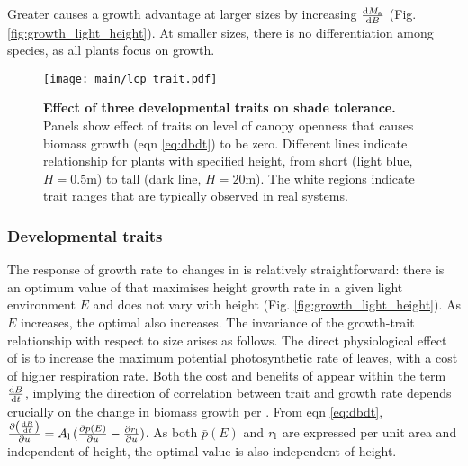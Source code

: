 \documentclass[9pt,twocolumn,twoside,lineno]{pnas-new}
\begin{document}
Greater {\hmat} causes a growth advantage at larger sizes by increasing $\frac{{\rm d}M_{\rm a}}{{\rm d}B}$ (Fig. \ref{fig:growth_light_height}). At smaller sizes, there is no differentiation among species, as all plants focus on growth.

\begin{SCfigure*}[\sidecaptionrelwidth][b]
\centering
\texttt{[image: main/lcp\_trait.pdf]}
\caption{\textbf{Effect of three developmental traits on shade tolerance.}
Panels show effect of traits on level of canopy openness that causes biomass growth (eqn \ref{eq:dbdt}) to be zero. Different lines indicate relationship for plants with specified height, from short (light blue,  $H=0.5$m) to tall (dark line, $H=20$m). The white regions indicate trait ranges that are typically observed in real systems.
\label{fig:wplcp}}
\end{SCfigure*}

\subsubsection{Developmental traits}  The response of growth rate to changes in {\nitrogen} is relatively straightforward: there is an optimum value of {\nitrogen} that maximises height growth rate in a given light environment $E$ and does not vary with height (Fig. \ref{fig:growth_light_height}). As $E$ increases, the optimal {\nitrogen} also increases. The invariance of the growth-trait relationship with respect to size arises as follows. The direct physiological effect of {\nitrogen} is to increase the maximum potential photosynthetic rate of leaves, with a cost of higher respiration rate. Both the cost and benefits of {\nitrogen} appear within the term $\frac{ {\rm d}B}{{\rm d}t}$, implying the direction of correlation between trait and growth rate depends crucially on the change in biomass growth per {\nitrogen}.
From eqn \ref{eq:dbdt}, $\frac{\partial \left( \frac{ {\rm d}B} {{\rm d}t}\right)}{\partial
u} = A_{\rm l} \, (\frac{ \partial \bar{p}(E)}{\partial
u}  - \frac{ \partial r_{\rm l}}{\partial
u} )$. As both $\bar{p}(E)$ and $r_{\rm l}$ are expressed per unit area and independent of height, the optimal value is also independent of height.
\end{document}
